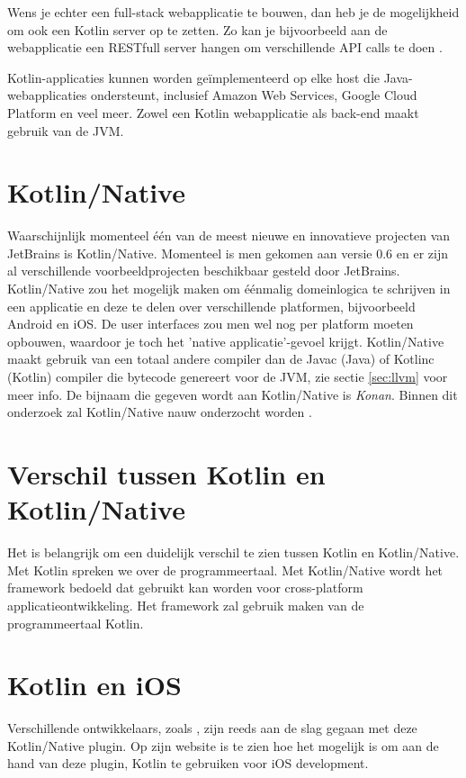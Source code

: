 Wens je echter een full-stack webapplicatie te bouwen, dan heb je de mogelijkheid om ook een Kotlin server op te zetten. Zo kan je bijvoorbeeld aan de webapplicatie een RESTfull server hangen om verschillende API calls te doen  \autocite{JetBrainsServer}.

Kotlin-applicaties kunnen worden geïmplementeerd op elke host die Java-webapplicaties ondersteunt, inclusief Amazon Web Services, Google Cloud Platform en veel meer. Zowel een Kotlin webapplicatie als back-end maakt gebruik van de JVM.

\section{Kotlin/Native}
\label{sec:kotlinnative}
Waarschijnlijk momenteel één van de meest nieuwe en innovatieve projecten van JetBrains is Kotlin/Native. Momenteel is men gekomen aan versie 0.6 en er zijn al verschillende voorbeeldprojecten beschikbaar gesteld door JetBrains. Kotlin/Native zou het mogelijk maken om éénmalig domeinlogica te schrijven in een applicatie en deze te delen over verschillende platformen, bijvoorbeeld Android en iOS. De user interfaces zou men wel nog per platform moeten opbouwen, waardoor je toch het 'native applicatie'-gevoel krijgt. Kotlin/Native maakt gebruik van een totaal andere compiler dan de Javac (Java) of Kotlinc (Kotlin) compiler die bytecode genereert voor de JVM, zie sectie \ref{sec:llvm} voor meer info. De bijnaam die gegeven wordt aan Kotlin/Native is \textit{Konan}. Binnen dit onderzoek zal Kotlin/Native nauw onderzocht worden \autocite{AlbertGao}.

\section{Verschil tussen Kotlin en Kotlin/Native}
\label{sec:differenceKotlinAndNative}
Het is belangrijk om een duidelijk verschil te zien tussen Kotlin en Kotlin/Native. Met Kotlin spreken we over de programmeertaal. Met Kotlin/Native wordt het framework bedoeld dat gebruikt kan worden voor cross-platform applicatieontwikkeling. Het framework zal gebruik maken van de programmeertaal Kotlin.

\section{Kotlin en iOS}
Verschillende ontwikkelaars, zoals \textcite{GaoIOS}, zijn reeds aan de slag gegaan met deze Kotlin/Native plugin. Op zijn website is te zien hoe het mogelijk is om aan de hand van deze plugin, Kotlin te gebruiken voor iOS development. 

